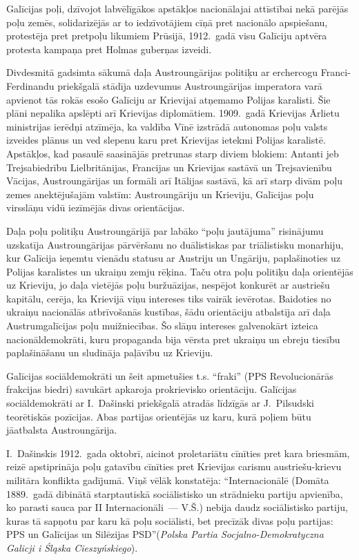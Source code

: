 \documentclass[twoside,a5paper,12pt,fleqn,openany]{extbook}
\newcommand{\pltxti}[1]{\textit{\textpolish{#1}}}
\begin{document}
Galīcijas poļi, dzīvojot labvēlīgākos apstākļos nacionālajai attīstībai nekā parējās poļu zemēs, solidarizējās ar to iedzīvotājiem cīņā pret nacionālo apspiešanu, protestēja pret pretpoļu likumiem Prūsijā, 1912.~gadā visu Galīciju aptvēra protesta kampaņa pret Holmas guberņas izveidi.

Divdesmitā gadsimta sākumā daļa Austroungārijas politiķu ar erchercogu Franci-Ferdinandu priekšgalā stādīja uzdevumus Austroungārijas imperatora varā apvienot tās rokās esošo Galīciju ar Krievijai atņemamo Polijas karalisti. Šie plāni nepalika apslēpti arī Krievijas diplomātiem. 1909.~gadā Krievijas Ārlietu ministrijas ierēdņi atzīmēja, ka valdība Vīnē izstrādā autonomas poļu valsts izveides plānus un ved slepenu karu pret Krievijas ietekmi Polijas karalistē. Apstākļos, kad pasaulē saasinājās pretrunas starp diviem blokiem: Antanti jeb Trejsabiedrību Lielbritānijas, Francijas un Krievijas sastāvā un Trejsavienību Vācijas, Austroungārijas un formāli arī Itālijas sastāvā, kā arī starp divām poļu zemes anektējušajām valstīm: Austroungāriju un Krieviju, Galīcijas poļu virsslāņu vidū iezīmējās divas orientācijas.

Daļa poļu politiķu Austroungārijā par labāko ``poļu jautājuma'' risinājumu uzskatīja Austroungārijas pārvēršanu no duālistiskas par triālistisku monarhiju, kur Galīcija ieņemtu vienādu statusu ar Austriju un Ungāriju, paplašinoties uz Polijas karalistes un ukraiņu zemju rēķina. Taču otra poļu politiķu daļa orientējās uz Krieviju, jo daļa vietējās poļu buržuāzijas, nespējot konkurēt ar austriešu kapitālu, cerēja, ka Krievijā viņu intereses tiks vairāk ievērotas. Baidoties no ukraiņu nacionālās atbrīvošanās kustības, šādu orientāciju atbalstīja arī daļa Austrumgalīcijas poļu muižniecības. Šo slāņu intereses galvenokārt izteica nacionāldemokrāti, kuru propaganda bija vērsta pret ukraiņu un ebreju tiesību paplašināšanu un sludināja paļāvību uz Krieviju.

Galīcijas sociāldemokrāti un šeit apmetušies t.s. ``fraki'' (PPS Revolucionārās frakcijas biedri) savukārt apkaroja prokrievisko orientāciju. Galīcijas sociāldemokrāti ar I.~Dašinski priekšgalā atradās līdzīgās ar J.~Pilsudski teorētiskās pozīcijas. Abas partijas orientējās uz karu, kurā poļiem būtu jāatbalsta Austroungārija.

I.~Dašinskis 1912.~gada oktobrī, aicinot proletariātu cīnīties pret kara briesmām, reizē apstiprināja poļu gatavību cīnīties pret Krievijas carismu austriešu-krievu militāra konflikta gadījumā. Viņš vēlāk konstatēja: ``Internacionālē (Domāta 1889.~gadā dibinātā starptautiskā sociālistisko un strādnieku partiju apvienība, ko parasti sauca par II Internacionāli~--- V.Š.) nebija daudz sociālistisko partiju, kuras tā sapņotu par karu kā poļu sociālisti, bet precīzāk divas poļu partijas: PPS un Galīcijas un Silēzijas PSD''(\pltxti{Polska Partia Socjalno-Demokratyczna Galicji i Śląska Cieszyńskiego}).
\end{document}
